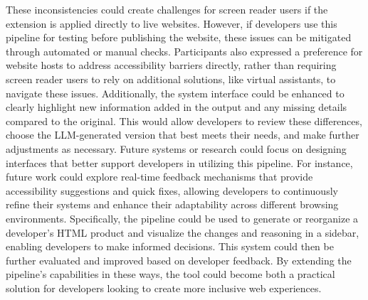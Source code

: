 These inconsistencies could create challenges for screen reader users if the extension is applied directly to live websites. However, if developers use this pipeline for testing before publishing the website, these issues can be mitigated through automated or manual checks. Participants also expressed a preference for website hosts to address accessibility barriers directly, rather than requiring screen reader users to rely on additional solutions, like virtual assistants, to navigate these issues. Additionally, the system interface could be enhanced to clearly highlight new information added in the output and any missing details compared to the original. This would allow developers to review these differences, choose the LLM-generated version that best meets their needs, and make further adjustments as necessary. Future systems or research could focus on designing interfaces that better support developers in utilizing this pipeline. For instance, future work could explore real-time feedback mechanisms that provide accessibility suggestions and quick fixes, allowing developers to continuously refine their systems and enhance their adaptability across different browsing environments. Specifically, the pipeline could be used to generate or reorganize a developer's HTML product and visualize the changes and reasoning in a sidebar, enabling developers to make informed decisions. This system could then be further evaluated and improved based on developer feedback. By extending the pipeline’s capabilities in these ways, the tool could become both a practical solution for developers looking to create more inclusive web experiences.

